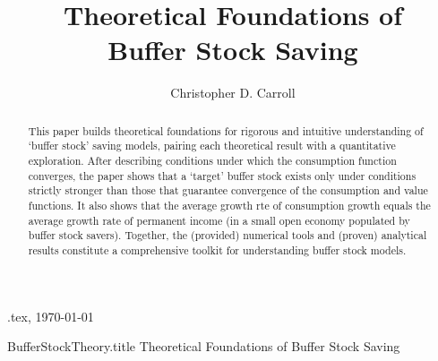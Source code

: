 \documentclass[./BufferStockTheory.tex]{subfiles}
\begin{document}
\hfill{\tiny \texname.tex, \today}

\begin{verbatimwrite}{BufferStockTheory.title}  %
Theoretical Foundations of Buffer Stock Saving
\end{verbatimwrite}

\title{Theoretical Foundations of \\ Buffer Stock Saving}

\author{Christopher D. Carroll\authNum}



\maketitle 

\hypertarget{abstract}{}
\begin{abstract}
This paper builds theoretical foundations for rigorous and intuitive understanding of `buffer stock' saving models, pairing each theoretical result with a quantitative exploration.  After describing conditions under which the consumption function converges, the paper shows that a `target' buffer stock exists only under conditions strictly stronger than those that guarantee convergence of the consumption and value functions.  It also shows that the average growth rte of consumption growth equals the average growth rate of permanent income (in a small open economy populated by buffer stock savers).  Together, the (provided) numerical tools and (proven) analytical results constitute a comprehensive toolkit for understanding buffer stock models.
\end{abstract}
\end{document}
